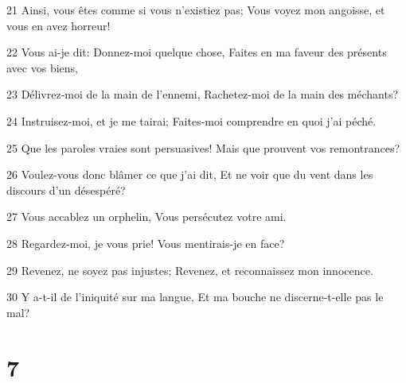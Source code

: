 \par 21 Ainsi, vous êtes comme si vous n'existiez pas; Vous voyez mon angoisse, et vous en avez horreur!
\par 22 Vous ai-je dit: Donnez-moi quelque chose, Faites en ma faveur des présents avec vos biens,
\par 23 Délivrez-moi de la main de l'ennemi, Rachetez-moi de la main des méchants?
\par 24 Instruisez-moi, et je me tairai; Faites-moi comprendre en quoi j'ai péché.
\par 25 Que les paroles vraies sont persuasives! Mais que prouvent vos remontrances?
\par 26 Voulez-vous donc blâmer ce que j'ai dit, Et ne voir que du vent dans les discours d'un désespéré?
\par 27 Vous accablez un orphelin, Vous persécutez votre ami.
\par 28 Regardez-moi, je vous prie! Vous mentirais-je en face?
\par 29 Revenez, ne soyez pas injustes; Revenez, et reconnaissez mon innocence.
\par 30 Y a-t-il de l'iniquité sur ma langue, Et ma bouche ne discerne-t-elle pas le mal?

\chapter{7}

